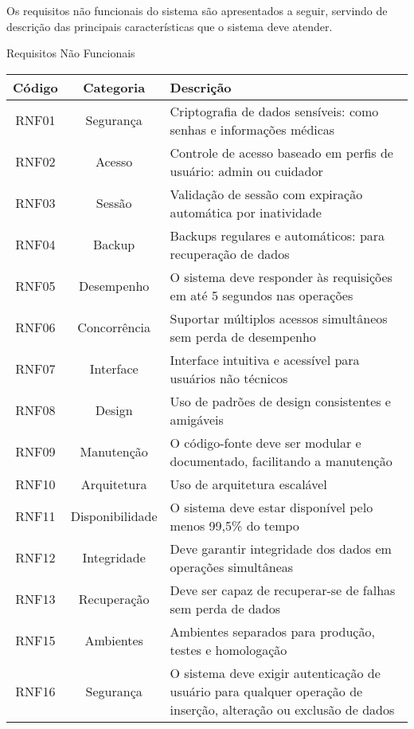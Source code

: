 Os requisitos não funcionais do sistema são apresentados a seguir, servindo de descrição das principais características que o sistema deve atender.

\begin{quadro}
    \caption{\label{quadro_requisitos_nf}Requisitos Não Funcionais}
    \begin{tabular}{|c|c|p{10cm}|}
        \hline
        \textbf{Código} & \textbf{Categoria} & \textbf{Descrição} \\ \hline
        RNF01  & Segurança       & Criptografia de dados sensíveis: como senhas e informações médicas \\ \hline
        RNF02  & Acesso          & Controle de acesso baseado em perfis de usuário: admin ou cuidador \\ \hline
        RNF03  & Sessão          & Validação de sessão com expiração automática por inatividade \\ \hline
        RNF04  & Backup          & Backups regulares e automáticos: para recuperação de dados \\ \hline
        RNF05  & Desempenho      & O sistema deve responder às requisições em até 5 segundos nas operações \\ \hline
        RNF06  & Concorrência    & Suportar múltiplos acessos simultâneos sem perda de desempenho \\ \hline
        RNF07  & Interface       & Interface intuitiva e acessível para usuários não técnicos \\ \hline
        RNF08  & Design          & Uso de padrões de design consistentes e amigáveis \\ \hline
        RNF09  & Manutenção      & O código-fonte deve ser modular e documentado, facilitando a manutenção \\ \hline
        RNF10  & Arquitetura     & Uso de arquitetura escalável \\ \hline
        RNF11  & Disponibilidade & O sistema deve estar disponível pelo menos 99,5\% do tempo \\ \hline
        RNF12  & Integridade     & Deve garantir integridade dos dados em operações simultâneas \\ \hline
        RNF13  & Recuperação     & Deve ser capaz de recuperar-se de falhas sem perda de dados \\ \hline
        RNF15  & Ambientes       & Ambientes separados para produção, testes e homologação \\ \hline
        RNF16  & Segurança       & O sistema deve exigir autenticação de usuário para qualquer operação de inserção, alteração ou exclusão de dados \\ \hline
    \end{tabular}
\end{quadro}
